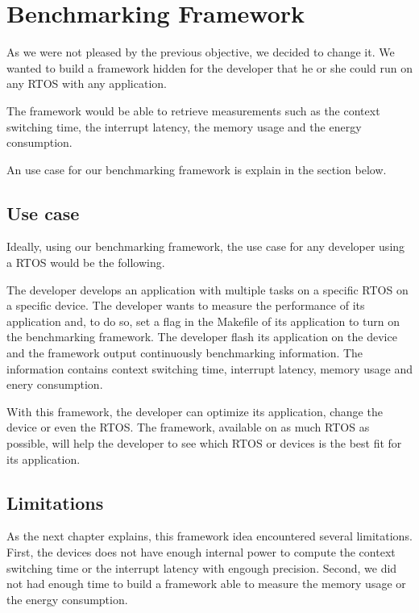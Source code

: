 \section{Benchmarking Framework}
 
As we were not pleased by the previous objective, we decided to change it.
We wanted to build a framework hidden for the developer that he or she could run on any RTOS with any application.

The framework would be able to retrieve measurements such as the context switching time, the interrupt latency, the memory usage and the energy consumption.

An use case for our benchmarking framework is explain in the section below.

\subsection{Use case}
Ideally, using our benchmarking framework, the use case for any developer using a RTOS would be the following.

The developer develops an application with multiple tasks on a specific RTOS on a specific device.
The developer wants to measure the performance of its application and, to do so, set a flag in the Makefile of its application to turn on the benchmarking framework.
The developer flash its application on the device and the framework output continuously benchmarking information.
The information contains context switching time, interrupt latency, memory usage and enery consumption.

With this framework, the developer can optimize its application, change the device or even the RTOS.
The framework, available on as much RTOS as possible, will help the developer to see which RTOS or devices is the best fit for its application.

\subsection{Limitations}
As the next chapter explains, this framework idea encountered several limitations.
First, the devices does not have enough internal power to compute the context switching time or the interrupt latency with engough precision.
Second, we did not had enough time to build a framework able to measure the memory usage or the energy consumption.